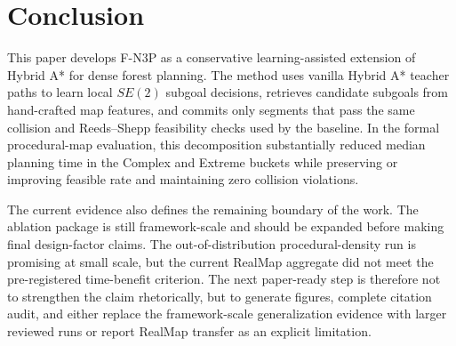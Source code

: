 \documentclass[11pt,a4paper]{article}
\begin{document}
\section{Conclusion}
\label{sec:conclusion}
This paper develops F-N3P as a conservative learning-assisted extension of Hybrid A* for dense forest planning. The method uses vanilla Hybrid A* teacher paths to learn local $SE(2)$ subgoal decisions, retrieves candidate subgoals from hand-crafted map features, and commits only segments that pass the same collision and Reeds--Shepp feasibility checks used by the baseline. In the formal procedural-map evaluation, this decomposition substantially reduced median planning time in the Complex and Extreme buckets while preserving or improving feasible rate and maintaining zero collision violations.

The current evidence also defines the remaining boundary of the work. The ablation package is still framework-scale and should be expanded before making final design-factor claims. The out-of-distribution procedural-density run is promising at small scale, but the current RealMap aggregate did not meet the pre-registered time-benefit criterion. The next paper-ready step is therefore not to strengthen the claim rhetorically, but to generate figures, complete citation audit, and either replace the framework-scale generalization evidence with larger reviewed runs or report RealMap transfer as an explicit limitation.



\end{document}
